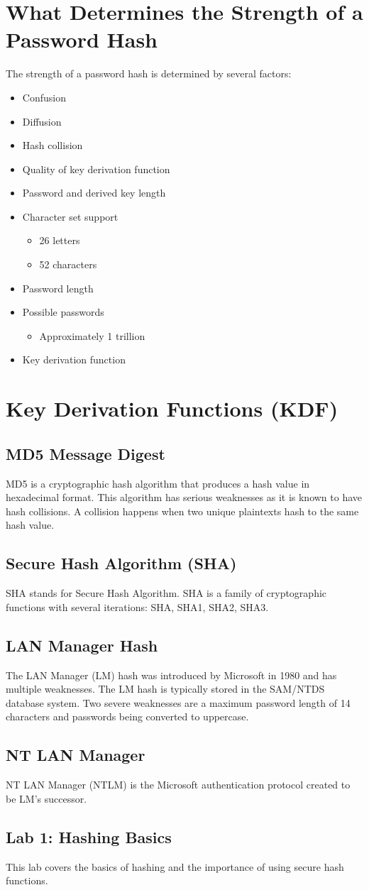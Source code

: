 \documentclass[12pt, apa, man, natbib]{apa6}
\begin{document}
\section{What Determines the Strength of a Password Hash}
The strength of a password hash is determined by several factors:
\begin{itemize}
    \item Confusion
    \item Diffusion
    \item Hash collision
    \item Quality of key derivation function
    \item Password and derived key length
    \item Character set support
        \begin{itemize}
            \item 26 letters
            \item 52 characters
        \end{itemize}
    \item Password length
    \item Possible passwords
        \begin{itemize}
            \item Approximately 1 trillion
        \end{itemize}
    \item Key derivation function
\end{itemize}

\section{Key Derivation Functions (KDF)}
\subsection{MD5 Message Digest}
MD5 is a cryptographic hash algorithm that produces a hash value in hexadecimal format. This algorithm has serious weaknesses as it is known to have hash collisions. A collision happens when two unique plaintexts hash to the same hash value.

\subsection{Secure Hash Algorithm (SHA)}
SHA stands for Secure Hash Algorithm. SHA is a family of cryptographic functions with several iterations: SHA, SHA1, SHA2, SHA3.

\subsection{LAN Manager Hash}
The LAN Manager (LM) hash was introduced by Microsoft in 1980 and has multiple weaknesses. The LM hash is typically stored in the SAM/NTDS database system. Two severe weaknesses are a maximum password length of 14 characters and passwords being converted to uppercase.

\subsection{NT LAN Manager}
NT LAN Manager (NTLM) is the Microsoft authentication protocol created to be LM's successor.

\subsection{Lab 1: Hashing Basics}
This lab covers the basics of hashing and the importance of using secure hash functions.
\end{document}
